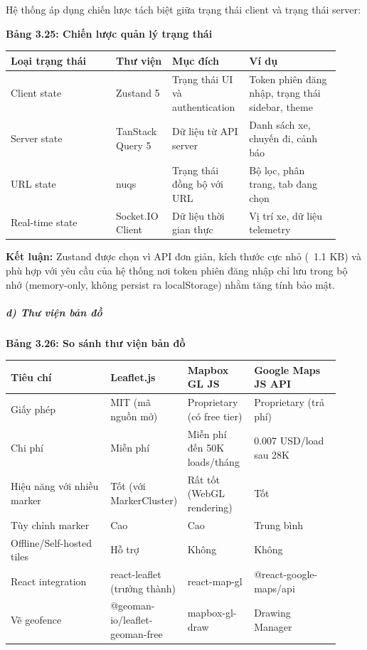 \documentclass[13pt,a4paper]{extarticle}
\newcounter{none} %
\newcommand{\thesislongtableorignewline}{}
\let\thesislongtableorignewline\\
\renewcommand{\\}{\thesislongtableorignewline\hline}%
\let\\\thesislongtableorignewline
\newcommand{\thesistabletitle}[1]{%
  \begin{center}\textbf{#1}\end{center}%
}
\begin{document}
Hệ thống áp dụng chiến lược tách biệt giữa trạng thái client và trạng
thái server:

\thesistabletitle{Bảng 3.25: Chiến lược quản lý trạng thái}

{\def\LTcaptype{none} %
\begin{longtable}{|p{0.30\linewidth}|p{0.16\linewidth}|p{0.20\linewidth}|p{0.26\linewidth}|}
\hline \textbf{Loại trạng thái} & \textbf{Thư viện} & \textbf{Mục đích} & \textbf{Ví dụ} \\
\hline
\endhead
\hline
\endlastfoot
Client state & Zustand 5 & Trạng thái UI và authentication & Token phiên
đăng nhập, trạng thái sidebar, theme \\
Server state & TanStack Query 5 & Dữ liệu từ API server & Danh sách xe,
chuyến đi, cảnh báo \\
URL state & nuqs & Trạng thái đồng bộ với URL & Bộ lọc, phân trang, tab
đang chọn \\
Real-time state & Socket.IO Client & Dữ liệu thời gian thực & Vị trí xe,
dữ liệu telemetry \\
\end{longtable}
}

\textbf{Kết luận:} Zustand được chọn vì API đơn giản, kích thước cực nhỏ
(~1.1 KB) và phù hợp với yêu cầu của hệ thống nơi token
phiên đăng nhập chỉ lưu trong bộ nhớ (memory-only, không persist ra
localStorage) nhằm tăng tính bảo mật.

\subparagraph{d) Thư viện bản
đồ}\label{d-thux1b0-viux1ec7n-bux1ea3n-ux111ux1ed3}

\thesistabletitle{Bảng 3.26: So sánh thư viện bản đồ}

{\def\LTcaptype{none} %
\begin{longtable}{|p{0.30\linewidth}|p{0.16\linewidth}|p{0.20\linewidth}|p{0.26\linewidth}|}
\hline \textbf{Tiêu chí} & \textbf{Leaflet.js} & \textbf{Mapbox GL JS} & \textbf{Google Maps JS API} \\
\hline
\endhead
\hline
\endlastfoot
Giấy phép & MIT (mã nguồn mở) & Proprietary (có free tier) & Proprietary
(trả phí) \\
Chi phí & Miễn phí & Miễn phí đến 50K loads/tháng & 0.007 USD/load sau
28K \\
Hiệu năng với nhiều marker & Tốt (với MarkerCluster) & Rất tốt (WebGL
rendering) & Tốt \\
Tùy chỉnh marker & Cao & Cao & Trung bình \\
Offline/Self-hosted tiles & Hỗ trợ & Không & Không \\
React integration & react-leaflet (trưởng thành) & react-map-gl &
@react-google-maps/api \\
Vẽ geofence & @geoman-io/leaflet-geoman-free & mapbox-gl-draw & Drawing
Manager \\
\end{longtable}
}
\end{document}
